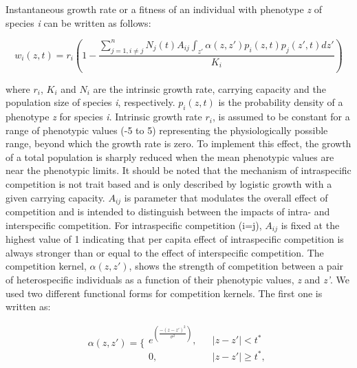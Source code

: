 \documentclass[12pt]{article}
\begin{document}
Instantaneous growth rate or a fitness of an individual with phenotype \emph{z} of species \emph{i} can be written as follows\cite{Lande:1979,Taper1985,barabas2016effect}:

\begin{linenomath*}
\begin{equation}
    w_i(z,t) = r_i \left(1-\frac{\sum \limits_{j=1,i\neq j}^{n} N_j(t)A_{ij}\int_{z'} \alpha(z,z')p_i(z,t)p_j(z',t)dz'}{K_i}\right)
    \label{fitness}
\end{equation}
\end{linenomath*}



where $r_i$, $K_i$ and $N_i$ are the intrinsic growth rate, carrying capacity and the population size of species \emph{i}, respectively. $p_i(z,t)$ is the probability density of a phenotype \emph{z} for species \emph{i}. Intrinsic growth rate $r_i$, is assumed to be constant for a range of phenotypic values (-5 to 5) representing the physiologically possible range, beyond which the growth rate is zero. To implement this effect, the growth of a total population is sharply reduced when the mean phenotypic values are near the phenotypic limits. It should be noted that the mechanism of intraspecific competition is not trait based and is only described by logistic growth with a given carrying capacity. $A_{ij}$ is parameter that modulates the overall effect of competition and is intended to distinguish between the impacts of intra- and interspecific competition. For intraspecific competition (i=j), $A_{ij}$ is fixed at the highest value of 1 indicating that per capita effect of intraspecific competition is always stronger than or equal to the effect of interspecific competition. The competition kernel, $\alpha(z,z')$, shows the strength of competition between a pair of heterospecific individuals as a function of their phenotypic values, \emph{z} and \emph{z'}. We used two different functional forms for competition kernels. The first one is written as:

\begin{linenomath*}
\begin{equation}
\alpha(z,z') = \biggl\{
\begin{matrix}
e^{\left(\frac{-(z-z')^2}{\sigma^2}\right)}, & & |z-z'|<t^*
\\
0, & & |z-z'| \geqslant t^*,
\end{matrix}
\label{kernel1}
\end{equation}
\end{linenomath*}
\end{document}
